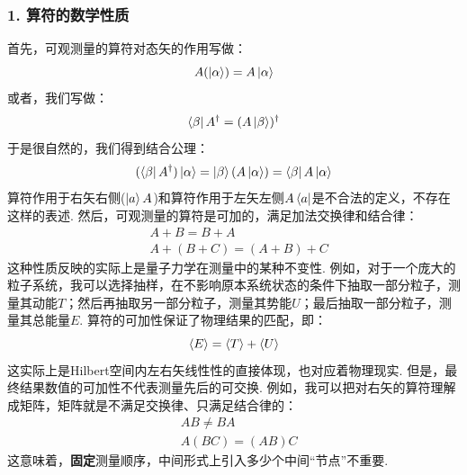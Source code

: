 \subsubsection{1. 算符的数学性质}
首先，可观测量的算符对态矢的作用写做：
\[
A(\ket{\alpha}) = A\ket{\alpha}
\]
或者，我们写做：
\[
\bra{\beta}A^{\dagger} = (A\ket{\beta})^{\dagger}
\]
于是很自然的，我们得到结合公理：
\[
(\bra{\beta}A^{\dagger})\ket{\alpha} = \ket{\beta}(A\ket{\alpha}) = \bra{\beta}A\ket{\alpha}
\]
算符作用于右矢右侧(\(\ket{a}A\))和算符作用于左矢左侧\(A\bra{a}\)是不合法的定义，不存在这样的表述. 然后，可观测量的算符是可加的，满足加法交换律和结合律：
\begin{align*}
& A + B = B + A \\
& A + (B + C) = (A + B) + C
\end{align*}
这种性质反映的实际上是量子力学在测量中的某种不变性. 例如，对于一个庞大的粒子系统，我可以选择抽样，在不影响原本系统状态的条件下抽取一部分粒子，测量其动能\(T\)；然后再抽取另一部分粒子，测量其势能\(U\)；最后抽取一部分粒子，测量其总能量\(E\). 算符的可加性保证了物理结果的匹配，即：
\[
\left\langle{E}\right\rangle = \left\langle{T}\right\rangle + \left\langle{U}\right\rangle
\]
这实际上是Hilbert空间内左右矢线性性的直接体现，也对应着物理现实. 但是，最终结果数值的可加性不代表测量先后的可交换. 例如，我可以把对右矢的算符理解成矩阵，矩阵就是不满足交换律、只满足结合律的：
\begin{align*}
& AB \neq BA \\
& A(BC) = (AB)C
\end{align*}
这意味着，\textbf{固定}测量顺序，中间形式上引入多少个中间“节点”不重要. 
